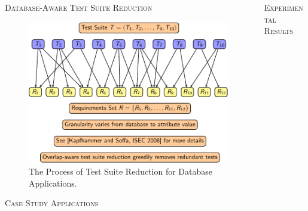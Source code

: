 \documentclass[final,t]{beamer}
\begin{document}
\begin{frame}{}
\begin{columns}[t]
\begin{column}{.325\linewidth}
\begin{block}{\textsc{Database-Aware Test Suite Reduction}}
          \begin{figure}			
  	    \centering
            \includegraphics[width=.95\linewidth]{test_coverage_monitoring_wrapper_crop}
            \vspace*{.05in}
	    \caption{The Process of Test Suite Reduction for Database Applications.}
            
	  \end{figure}          

	\end{block}
		
	\begin{block}{\textsc{Case Study Applications}}
          
            
            
	  \end{block}
	\end{column}

%
%
      \begin{column}{.325\linewidth}	
		
        \begin{block}{\textsc{Experimental Results}}

          

          \vspace*{-.5in}          


\end{block}
\end{column}
\end{columns}
\end{frame}
\end{document}
